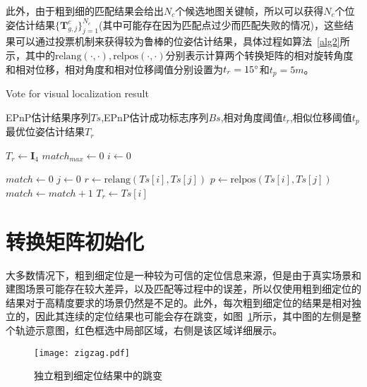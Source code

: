 此外，由于粗到细的匹配结果会给出$N_c$个候选地图关键帧，所以可以获得$N_c$个位姿估计结果$\{ \symbf{T}^{c}_{g,j} \}^{N_c}_{j=1}$(其中可能存在因为匹配点过少而匹配失败的情况)，这些结果可以通过投票机制来获得较为鲁棒的位姿估计结果，具体过程如算法~\ref{alg2}所示，其中的$\text{relang}(\cdot, \cdot),\text{relpos}(\cdot, \cdot)$分别表示计算两个转换矩阵的相对旋转角度和相对位移，相对角度和相对位移阈值分别设置为$t_r=15\degree$和$t_p=5m$。

\renewcommand{\algorithmicrequire}{\textbf{输入：}\unskip}
\renewcommand{\algorithmicensure}{\textbf{输出：}\unskip}
\begin{algorithm}
  \caption{Vote for visual localization result}
  \label{alg2}
  \small
  \begin{algorithmic}[1]
    \REQUIRE EPnP估计结果序列$Ts$,EPnP估计成功标志序列$Bs$,相对角度阈值$t_r$,相似位移阈值$t_p$
    \ENSURE 最优位姿估计结果$T_{r}$

    \STATE $T_{r} \leftarrow \symbf{I}_4$
    \STATE ${match}_{max} \leftarrow 0$
    \STATE $i \leftarrow 0$

      \STATE $match \leftarrow 0$
        \STATE $j \leftarrow 0$
          \STATE $r \leftarrow \text{relang}(Ts[i], Ts[j])$
          \STATE $p \leftarrow \text{relpos}(Ts[i], Ts[j])$
            \STATE $match \leftarrow match + 1$
          \ENDIF
        \ENDWHILE
          \STATE $T_{r} \leftarrow Ts[i]$
        \ENDIF
      \ENDIF
    \ENDWHILE
  \end{algorithmic}
\end{algorithm}

\section{转换矩阵初始化}

大多数情况下，粗到细定位是一种较为可信的定位信息来源，但是由于真实场景和建图场景可能存在较大差异，以及匹配等过程中的误差，所以仅使用粗到细定位的结果对于高精度要求的场景仍然是不足的。此外，每次粗到细定位的结果是相对独立的，因此其连续的定位结果也可能会存在跳变，如图~\ref{fig:zigzag}所示，其中图的左侧是整个轨迹示意图，红色框选中局部区域，右侧是该区域详细展示。

\begin{figure}
  \centering
  \texttt{[image: zigzag.pdf]}
  \caption{独立粗到细定位结果中的跳变}
  \label{fig:zigzag}
\end{figure}

